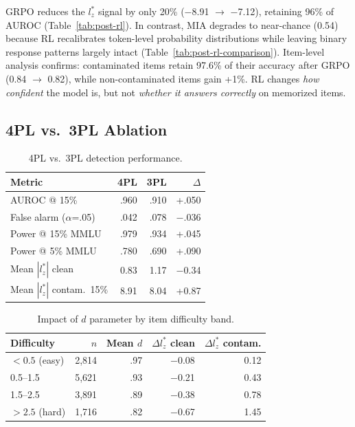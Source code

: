 \documentclass[11pt,a4paper]{article}
\begin{document}
GRPO reduces the $l_z^*$ signal by only 20\% ($-$8.91 $\to$ $-$7.12), retaining 96\% of AUROC (Table~\ref{tab:post-rl}). In contrast, MIA degrades to near-chance (0.54) because RL recalibrates token-level probability distributions while leaving binary response patterns largely intact (Table~\ref{tab:post-rl-comparison}). Item-level analysis confirms: contaminated items retain 97.6\% of their accuracy after GRPO (0.84 $\to$ 0.82), while non-contaminated items gain +1\%. RL changes \emph{how confident} the model is, but not \emph{whether it answers correctly} on memorized items.

\subsection{4PL vs.\ 3PL Ablation}
\label{sec:ablation}

\begin{table}[t]
\centering
\caption{4PL vs.\ 3PL detection performance.}
\label{tab:4pl-3pl}
\small
\begin{tabular}{lrrr}
\toprule
\textbf{Metric} & \textbf{4PL} & \textbf{3PL} & $\Delta$ \\
\midrule
AUROC @ 15\% & .960 & .910 & +.050 \\
False alarm ($\alpha$=.05) & .042 & .078 & $-$.036 \\
Power @ 15\% MMLU & .979 & .934 & +.045 \\
Power @ 5\% MMLU & .780 & .690 & +.090 \\
Mean $|l_z^*|$ clean & 0.83 & 1.17 & $-$0.34 \\
Mean $|l_z^*|$ contam.\ 15\% & 8.91 & 8.04 & +0.87 \\
\bottomrule
\end{tabular}
\end{table}

\begin{table}[t]
\centering
\caption{Impact of $d$ parameter by item difficulty band.}
\label{tab:d-param}
\small
\begin{tabular}{lrrrr}
\toprule
\textbf{Difficulty} & $n$ & Mean $d$ & $\Delta l_z^*$ clean & $\Delta l_z^*$ contam. \\
\midrule
$<0.5$ (easy) & 2{,}814 & .97 & $-$0.08 & 0.12 \\
0.5--1.5 & 5{,}621 & .93 & $-$0.21 & 0.43 \\
1.5--2.5 & 3{,}891 & .89 & $-$0.38 & 0.78 \\
$>2.5$ (hard) & 1{,}716 & .82 & $-$0.67 & 1.45 \\
\bottomrule
\end{tabular}
\end{table}
\end{document}
